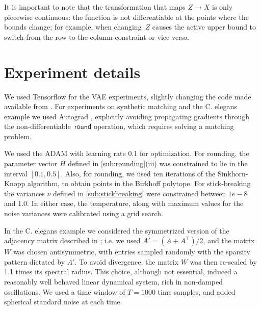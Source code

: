

It is important to note that the transformation that maps
$Z \rightarrow X$ is only piecewise continuous: the function is not
differentiable at the points where the bounds change; for example,
when changing~$Z$ causes the active upper bound to switch from the row
to the column constraint or vice versa.



\section{Experiment details}
We used Tensorflow \citep{Abadi2016} for the VAE experiments, slightly
changing the code made available from \cite{jang2016categorical}. For
experiments on synthetic matching and the C. elegans example we used
Autograd \citep{maclaurin2015autograd}, explicitly avoiding
propagating gradients through the non-differentiable~$\mathsf{round}$
operation, which requires solving a matching problem.

We used the ADAM with learning rate 0.1 for optimization. For
rounding, the parameter vector $H$ defined in \ref{sub:rounding}(iii)
was constrained to lie in the interval $[0.1, 0.5]$. Also, for
rounding, we used ten iterations of the Sinkhorn-Knopp algorithm, to
obtain points in the Birkhoff polytope. For stick-breaking the
variances $\nu$ defined in \ref{sub:stickbreaking} were constrained
between $1e-8$ and 1.0. In either case, the temperature, along with
maximum values for the noise variances were calibrated using a grid
search.
 
In the C. elegans example we considered the symmetrized version of the adjacency matrix described in \citep{varshney2011structural}; i.e. we used $A'=(A+A^\top)/2$, and the matrix $W$ was chosen antisymmetric, with entries sampled randomly with the sparsity pattern dictated by $A'$. To avoid divergence, the matrix $W$ was then re-scaled by 1.1 times its spectral radius. This choice, although not essential, induced a reasonably well behaved linear dynamical system, rich in non-damped oscillations. We used a time window of $T=1000$ time samples, and added spherical standard noise at each time. 
